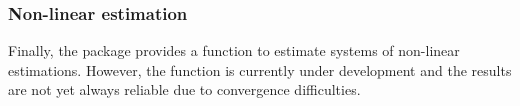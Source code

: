\subsubsection*{Non-linear estimation}
Finally, the  package provides a function to estimate
systems of non-linear estimations.
However, the function  is currently under
development and the results are not yet always reliable due to
convergence difficulties.





